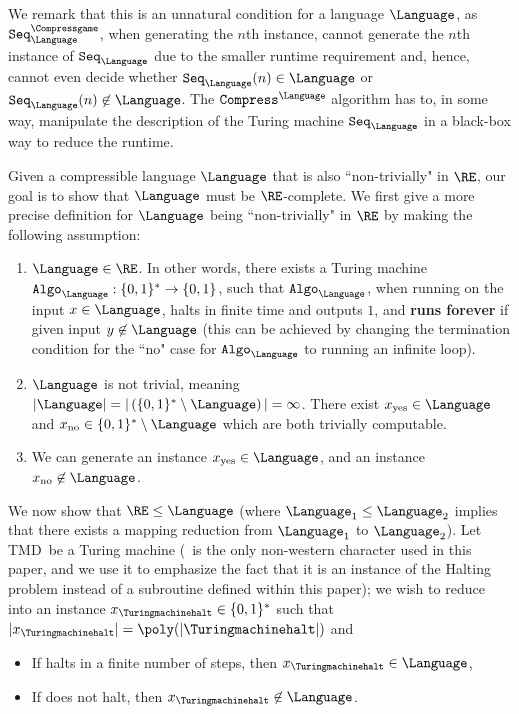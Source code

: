 We remark that this is an unnatural condition for a language $\Language$, as $\texttt{Seq}_{\Language}^{\Compressgame}$, when generating the $n$th instance, cannot generate the $n$th instance of $\texttt{Seq}_{\Language}$ due to the smaller runtime requirement and, hence, cannot even decide whether $\texttt{Seq}_{\Language}(n) \in \Language$ or $\texttt{Seq}_{\Language}(n) \not\in \Language$. The $\texttt{Compress}^{\Language}$ algorithm has to, in some way, manipulate the description of the Turing machine $\texttt{Seq}_{\Language}$ in a black-box way to reduce the runtime.

Given a compressible language $\Language$ that is also ``non-trivially" in $\RE$, our goal is to show that $\Language$ must be $\RE$-complete. We first give a more precise definition for $\Language$ being ``non-trivially" in $\RE$ by making the following assumption:
\begin{enumerate}
	\item  $\Language \in \RE$. In other words, there exists a Turing machine $\texttt{Algo}_{\Language}: \{0,1\}^* \rightarrow \{0,1\}$, such that $\texttt{Algo}_{\Language}$, when running on the input $x \in \Language$, halts in finite time and outputs $1$, and \textbf{runs forever} if given input $y \not\in \Language$  (this can be achieved by changing the termination condition for the ``no" case for $\texttt{Algo}_{\Language}$ to running an infinite loop).
	\item $\Language$ is not trivial, meaning $|\Language| = | \left(\{0,1\}^* \setminus \Language\right)| = \infty$. There exist $x_{\text{yes}} \in \Language$ and $x_{\text{no}} \in \{0,1\}^* \setminus \Language$ which are both trivially computable. 
	\item We can generate an instance $x_{\text{yes}} \in \Language$, and an instance $x_{\text{no}} \not\in \Language$. 
\end{enumerate}
We now show that $\RE \leq \Language$ (where $\Language_1 \leq \Language_2$ implies that there exists a mapping reduction from $\Language_1$ to $\Language_2$). Let \gls{TMD}~be a Turing machine (\Turingmachinehalt~is the only non-western character used in this paper, and we use it to emphasize the fact that it is an instance of the Halting problem instead of a subroutine defined within this paper); we wish to reduce \Turingmachinehalt into an instance $x_{\text\Turingmachinehalt} \in \{0,1\}^*$ such that $|x_{\text\Turingmachinehalt}| = \poly(|\text{\Turingmachinehalt}|)$ and 
\begin{itemize}
	\item If \Turingmachinehalt halts in a finite number of steps, then $x_{\text\Turingmachinehalt} \in \Language$,
	\item If \Turingmachinehalt does not halt, then $x_{\text\Turingmachinehalt} \not\in \Language$. 
\end{itemize}

